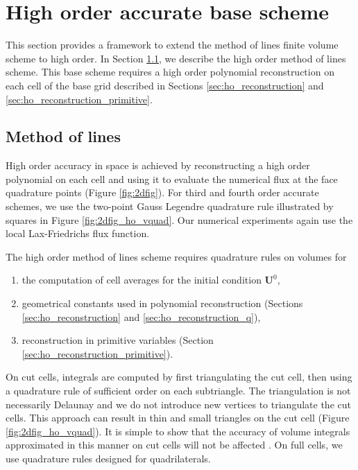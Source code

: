 \appendix
\section{High order accurate base scheme}\label{sec:ho}
This section provides a framework to extend the method of lines finite volume scheme to high order.  
In Section \ref{sec:ho_basescheme}, we describe the high order method of lines scheme.  This base scheme requires a high order polynomial reconstruction on each cell of the base grid described in Sections \ref{sec:ho_reconstruction} and \ref{sec:ho_reconstruction_primitive}.


\subsection{Method of lines} \label{sec:ho_basescheme}


High order accuracy in space is achieved by reconstructing a high order polynomial on each cell and using it to evaluate the numerical flux at the face quadrature points (Figure \ref{fig:2dfig}).  
For third and fourth order accurate schemes, we use the two-point Gauss
Legendre quadrature rule illustrated by squares in Figure \ref{fig:2dfig_ho_vquad}.  Our
numerical experiments again use the local Lax-Friedrichs flux function.

The high order method of lines scheme requires quadrature rules on volumes for 
\begin{enumerate}
	\item the computation of cell averages for the initial condition $\mathbf{U}^0$,
	\item geometrical constants used in polynomial reconstruction (Sections \ref{sec:ho_reconstruction} and \ref{sec:ho_reconstruction_q}),
	\item reconstruction in primitive variables (Section \ref{sec:ho_reconstruction_primitive}).
\end{enumerate}

On cut cells, integrals are computed by first triangulating the cut cell, then using a quadrature rule of sufficient order on each subtriangle.  The triangulation is not necessarily Delaunay and we do not introduce new vertices to triangulate the cut cells.  This approach can result in thin and small triangles on the cut cell (Figure \ref{fig:2dfig_ho_vquad}).  It is simple to show that the accuracy of volume integrals approximated in this manner on cut cells will not be affected \cite{QIN201324}.
On full cells, we use quadrature rules designed for quadrilaterals.  

